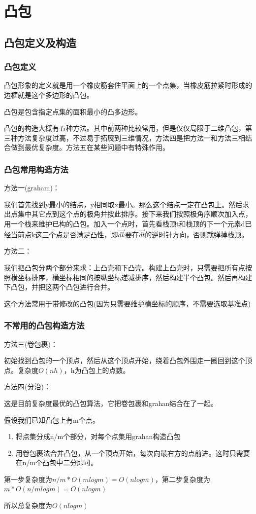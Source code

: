 \section{凸包}

\subsection{凸包定义及构造}
\begin{frame}
\frametitle{凸包定义}
\pause
凸包形象的定义就是用一个橡皮筋套住平面上的一个点集，当橡皮筋拉紧时形成的边框就是这个多边形的凸包。

\pause
凸包是包含指定点集的面积最小的凸多边形。\newline \newline

\pause
凸包的构造大概有五种方法。其中前两种比较常用，但是仅仅局限于二维凸包，第三种方法复杂度过高，不过易于拓展到三维情况，方法四是把方法一和方法三相结合做到最优复杂度。方法五在某些问题中有特殊作用。
\end{frame}

\begin{frame}
\frametitle{凸包常用构造方法}
\pause
方法一(graham)：

我们首先找到y最小的结点，y相同取x最小。那么这个结点一定在凸包上。然后求出点集中其它点到这个点的极角并按此排序。接下来我们按照极角序顺次加入点，用一个栈来维护已构的凸包。加入一个点时，首先看栈顶t和栈顶的下一个元素d已经当前点k这三个点是否满足凸性，即$\overrightarrow{dk}$要在$\overrightarrow{dt}$的逆时针方向，否则就弹掉栈顶。

\pause
方法二：

我们把凸包分两个部分来求：上凸壳和下凸壳。构建上凸壳时，只需要把所有点按照横坐标排序，横坐标相同的按纵坐标递减排序，然后构建半个凸包。然后再构建下凸包，并把这两个凸包进行合并。

\pause
这个方法常用于带修改的凸包(因为只需要维护横坐标的顺序，不需要选取基准点)
\end{frame}

\begin{frame}
\frametitle{不常用的凸包构造方法}
\pause
方法三(卷包裹)：

初始找到凸包的一个顶点，然后从这个顶点开始，绕着凸包外围走一圈回到这个顶点。复杂度$O(nh)$，h为凸包上的点数。

\pause
方法四(分治)：

这是目前复杂度最优的凸包算法，它把卷包裹和grahan结合在了一起。

假设我们已知凸包上有m个点。
\pause
\begin{enumerate}
    \item 将点集分成n/m个部分，对每个点集用grahan构造凸包
    \item 用卷包裹法合并凸包，从一个顶点开始，每次向最右方的点前进。这时只需要在n/m个凸包中二分即可。
\end{enumerate}
第一步复杂度为$n/m *O(mlogm)=O(nlogm)$，第二步复杂度为$m*O(n/mlogm)=O(nlogm)$

所以总复杂度为$O(nlogm)$
\end{frame}

